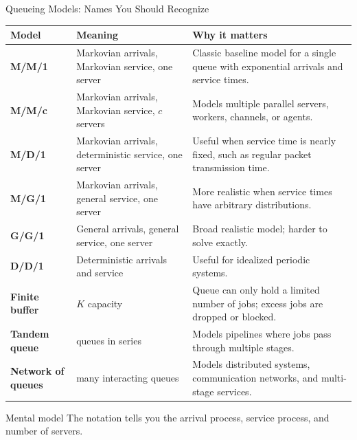 \documentclass[aspectratio=169]{beamer}
\begin{document}
\begin{frame}{Queueing Models: Names You Should Recognize}
\tiny

\begin{tabular}{p{2.0cm} p{3.2cm} p{6.8cm}}
\toprule
\textbf{Model} & \textbf{Meaning} & \textbf{Why it matters} \\
\midrule
\textbf{M/M/1} & Markovian arrivals, Markovian service, one server & Classic baseline model for a single queue with exponential arrivals and service times. \\
\textbf{M/M/c} & Markovian arrivals, Markovian service, $c$ servers & Models multiple parallel servers, workers, channels, or agents. \\
\textbf{M/D/1} & Markovian arrivals, deterministic service, one server & Useful when service time is nearly fixed, such as regular packet transmission time. \\
\textbf{M/G/1} & Markovian arrivals, general service, one server & More realistic when service times have arbitrary distributions. \\
\textbf{G/G/1} & General arrivals, general service, one server & Broad realistic model; harder to solve exactly. \\
\textbf{D/D/1} & Deterministic arrivals and service & Useful for idealized periodic systems. \\
\textbf{Finite buffer} & $K$ capacity & Queue can only hold a limited number of jobs; excess jobs are dropped or blocked. \\
\textbf{Tandem queue} & queues in series & Models pipelines where jobs pass through multiple stages. \\
\textbf{Network of queues} & many interacting queues & Models distributed systems, communication networks, and multi-stage services. \\
\bottomrule
\end{tabular}

\vspace{0.15cm}

\begin{block}{Mental model}
The notation tells you the arrival process, service process, and number of servers.
\end{block}

\end{frame}
\end{document}
